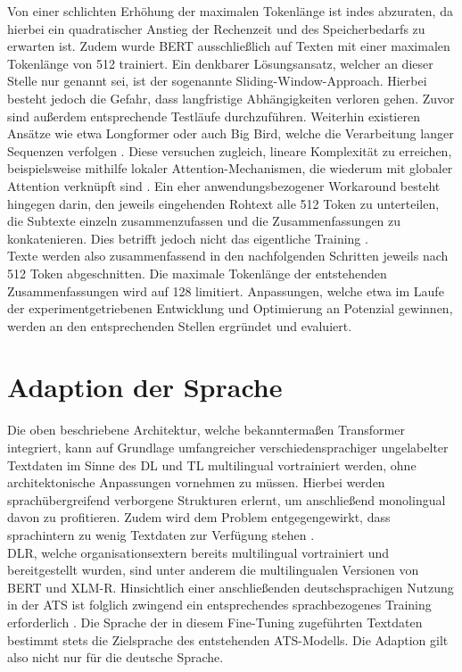 \noindent
Von einer schlichten Erhöhung der maximalen Tokenlänge ist indes abzuraten, da hierbei ein quadratischer Anstieg der Rechenzeit und des Speicherbedarfs zu erwarten ist. Zudem wurde \ac{BERT} ausschließlich auf Texten mit einer maximalen Tokenlänge von 512 trainiert. Ein denkbarer Lösungsansatz, welcher an dieser Stelle nur genannt sei, ist der sogenannte Sliding-Window-Approach. Hierbei besteht jedoch die Gefahr, dass langfristige Abhängigkeiten verloren gehen. Zuvor sind außerdem entsprechende Testläufe durchzuführen. Weiterhin existieren Ansätze wie etwa Longformer oder auch Big Bird, welche die Verarbeitung langer Sequenzen verfolgen \cite{ZAH21}. Diese versuchen zugleich, lineare Komplexität zu erreichen, beispielsweise mithilfe lokaler Attention-Mechanismen, die wiederum mit globaler Attention verknüpft sind \cite{BEL20}. Ein eher anwendungsbezogener Workaround besteht hingegen darin, den jeweils eingehenden Rohtext alle 512 Token zu unterteilen, die Subtexte einzeln zusammenzufassen und die Zusammenfassungen zu konkatenieren. Dies betrifft jedoch nicht das eigentliche Training \cite[S.~2]{DIN20}.\\

\noindent
Texte werden also zusammenfassend in den nachfolgenden Schritten jeweils nach 512 Token abgeschnitten. Die maximale Tokenlänge der entstehenden Zusammenfassungen wird auf 128 limitiert. Anpassungen, welche etwa im Laufe der experimentgetriebenen Entwicklung und Optimierung an Potenzial gewinnen, werden an den entsprechenden Stellen ergründet und evaluiert.

\section{Adaption der Sprache}
\noindent
Die oben beschriebene Architektur, welche bekanntermaßen Transformer integriert, kann auf Grundlage umfangreicher verschiedensprachiger ungelabelter Textdaten im Sinne des \ac{DL} und \ac{TL} multilingual vortrainiert werden, ohne architektonische Anpassungen vornehmen zu müssen. Hierbei werden sprachübergreifend verborgene Strukturen erlernt, um anschließend monolingual davon zu profitieren. Zudem wird dem Problem entgegengewirkt, dass sprachintern zu wenig Textdaten zur Verfügung stehen \cite{MOB20}.\\

\noindent
\ac{DLR}, welche organisationsextern bereits multilingual vortrainiert und bereitgestellt wurden, sind unter anderem die multilingualen Versionen von \ac{BERT} und \ac{XLM-R}. Hinsichtlich einer anschließenden deutschsprachigen Nutzung in der \ac{ATS} ist folglich zwingend ein entsprechendes sprachbezogenes Training erforderlich \cite[S.~3-4]{YAN19}. Die Sprache der in diesem Fine-Tuning zugeführten Textdaten bestimmt stets die Zielsprache des entstehenden \ac{ATS}-Modells. Die Adaption gilt also nicht nur für die deutsche Sprache.\\

